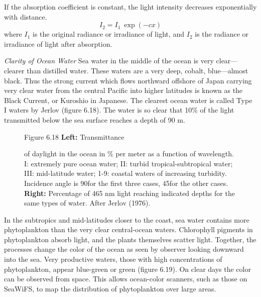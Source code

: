 If the absorption coefficient is constant, the light intensity
decreases exponentially with distance.
\begin{equation}
I_2 = I_1 \: \exp(-cx)
\end{equation}
where $I_1$ is the original radiance or irradiance of light, and $I_2$
is the radiance or irradiance of light after absorption.

\textit{Clarity of Ocean Water} Sea
water in the middle of the ocean is very clear---clearer than
distilled water. These waters are a very deep, cobalt, blue---almost
black. Thus the strong current which flows northward offshore of Japan
carrying very clear water from the central Pacific into higher
latitudes is known as the Black Current, or Kuroshio
in Japanese. The clearest ocean water is called Type I waters by
Jerlov (figure 6.18). The water is so clear that 10\% of the light
transmitted below the sea surface reaches a depth of 90 m.

\begin{figure}[t!]
\footnotesize
Figure 6.18 \textbf{Left:} Transmittance \rule{0mm}{3ex}of daylight in
the ocean in \% per meter as a function of wavelength. I: extremely
pure ocean water; II: turbid tropical-subtropical water; III:
mid-latitude water; 1-9: coastal waters of increasing
turbidity. Incidence angle is 90\degrees for the first three cases,
45\degrees for the other cases. \textbf{Right:} Percentage of 465 nm
light reaching indicated depths for the same types of water. After
Jerlov (1976).
\label{fig:jerlov}
\vspace{-3ex}
\end{figure}

In the subtropics and mid-latitudes closer to the coast, sea water
contains more phytoplankton than the very clear central-ocean
waters. Chlorophyll pigments in phytoplankton absorb light, and the
plants themselves scatter light. Together, the processes change the
color of the ocean as seen by observer looking downward into the
sea. Very productive waters, those with high concentrations of
phytoplankton, appear blue-green or green (figure 6.19). On clear days
the color can be observed from space. This allows ocean-color
scanners, such as those on SeaWiFS, to map the distribution of
phytoplankton over large areas.

